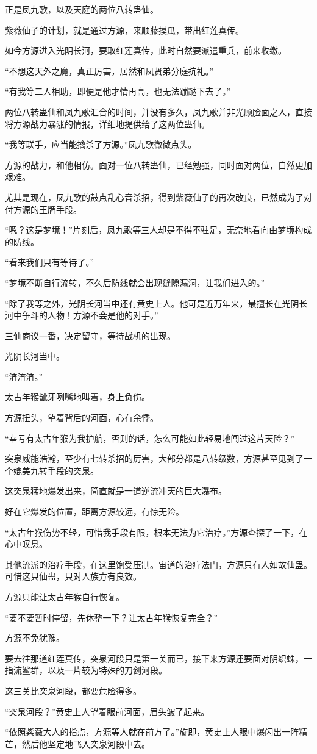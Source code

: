 \begin{this_body}
正是凤九歌，以及天庭的两位八转蛊仙。

紫薇仙子的计划，就是通过方源，来顺藤摸瓜，带出红莲真传。

如今方源进入光阴长河，要取红莲真传，此时自然要派遣重兵，前来收缴。

“不想这天外之魔，真正厉害，居然和凤贤弟分庭抗礼。”

“有我等二人相助，即便是他才情再高，也无法蹦跶下去了。”

两位八转蛊仙和凤九歌汇合的时间，并没有多久，凤九歌并非光顾脸面之人，直接将方源战力暴涨的情报，详细地提供给了这两位蛊仙。

“我等联手，应当能擒杀了方源。”凤九歌微微点头。

方源的战力，和他相仿。面对一位八转蛊仙，已经勉强，同时面对两位，自然更加艰难。

尤其是现在，凤九歌的鼓点乱心音杀招，得到紫薇仙子的再次改良，已然成为了对付方源的王牌手段。

“嗯？这是梦境！”片刻后，凤九歌等三人却是不得不驻足，无奈地看向由梦境构成的防线。

“看来我们只有等待了。”

“梦境不断自行流转，不久后防线就会出现缝隙漏洞，让我们进入的。”

“除了我等之外，光阴长河当中还有黄史上人。他可是近万年来，最擅长在光阴长河中争斗的人物！方源不会是他的对手。”

三仙商议一番，决定留守，等待战机的出现。

光阴长河当中。

“渣渣渣。”

太古年猴龇牙咧嘴地叫着，身上负伤。

方源扭头，望着背后的河面，心有余悸。

“幸亏有太古年猴为我护航，否则的话，怎么可能如此轻易地闯过这片天险？”

突泉威能浩瀚，至少有七转杀招的厉害，大部分都是八转级数，方源甚至见到了一个媲美九转手段的突泉。

这突泉猛地爆发出来，简直就是一道逆流冲天的巨大瀑布。

好在它爆发的位置，距离方源较远，有惊无险。

“太古年猴伤势不轻，可惜我手段有限，根本无法为它治疗。”方源查探了一下，在心中叹息。

其他流派的治疗手段，在这里饱受压制。宙道的治疗法门，方源只有人如故仙蛊。可惜这只仙蛊，只对人族方有良效。

方源只能让太古年猴自行恢复。

“要不要暂时停留，先休整一下？让太古年猴恢复完全？”

方源不免犹豫。

要去往那道红莲真传，突泉河段只是第一关而已，接下来方源还要面对阴织蛛，一指流鲨群，以及一片较为特殊的刀剑河段。

这三关比突泉河段，都要危险得多。

“突泉河段？”黄史上人望着眼前河面，眉头皱了起来。

“依照紫薇大人的指点，方源等人就在前方了。”旋即，黄史上人眼中爆闪出一阵精芒，然后他坚定地飞入突泉河段中去。

\end{this_body}

